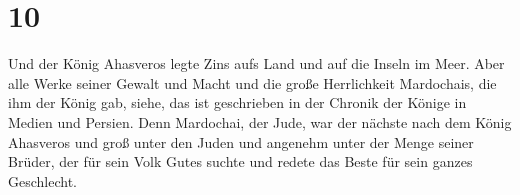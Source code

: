 \hypertarget{section-9}{%
\section{10}\label{section-9}}

 Und der König Ahasveros legte Zins aufs Land und auf die
Inseln im Meer.  Aber alle Werke seiner Gewalt und Macht und
die große Herrlichkeit Mardochais, die ihm der König gab, siehe, das ist
geschrieben in der Chronik der Könige in Medien und Persien.
 Denn Mardochai, der Jude, war der nächste nach dem König
Ahasveros und groß unter den Juden und angenehm unter der Menge seiner
Brüder, der für sein Volk Gutes suchte und redete das Beste für sein
ganzes Geschlecht.
